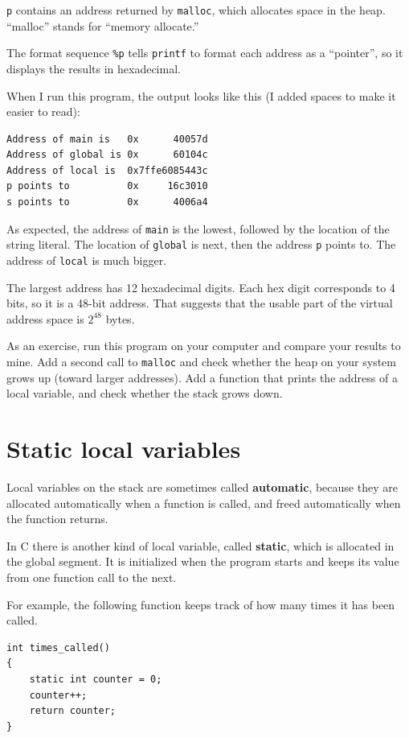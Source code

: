 \documentclass[12pt]{book}
\begin{document}
{{\tt p} contains an address returned by {\tt malloc}, which allocates
space in the heap.  ``malloc'' stands for ``memory allocate.''

The format sequence \verb"%p" tells {\tt printf} to format each
address as a ``pointer'', so it displays the results in hexadecimal.

When I run this program, the output looks like this (I added spaces
to make it easier to read):

\begin{verbatim}
Address of main is   0x      40057d
Address of global is 0x      60104c
Address of local is  0x7ffe6085443c
p points to          0x     16c3010
s points to          0x      4006a4

\end{verbatim}

As expected, the address of {\tt main} is the lowest, followed by
the location of the string literal.  The location of
{\tt global} is next, then the address {\tt p} points to.
The address of {\tt local} is much bigger.

The largest address has 12 hexadecimal digits.  Each hex digit
corresponds to 4 bits, so it is a 48-bit address.  That suggests
that the usable part of the virtual address space is $2^{48}$ bytes.

As an exercise, run this program on your computer and compare your
results to mine.  Add a second call to {\tt malloc} and check whether
the heap on your system grows up (toward larger addresses).  Add a
function that prints the address of a local variable, and check
whether the stack grows down.


\section{Static local variables}

Local variables on the stack are sometimes called {\bf automatic},
because they are allocated automatically when a function is called,
and freed automatically when the function returns.

In C there is another kind of local variable, called {\bf static},
which is allocated in the global segment.  It is initialized when
the program starts and keeps its value from one function call to
the next.

For example, the following function keeps track of how many times
it has been called.

\begin{verbatim}
int times_called()
{
    static int counter = 0;
    counter++;
    return counter;
}
\end{verbatim}

}
\end{document}
